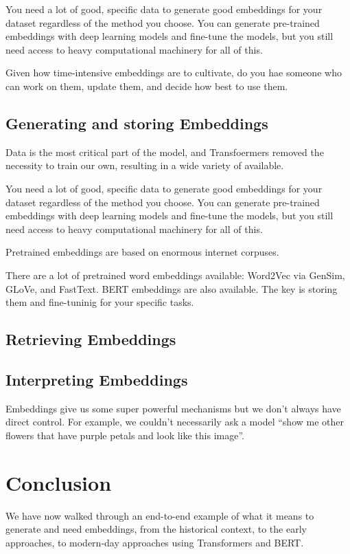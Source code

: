 \documentclass[11pt]{diazessay} %
\begin{document}
You need a lot of good, specific data to generate good embeddings for your dataset regardless of the method you choose. You can generate pre-trained embeddings with deep learning models and fine-tune the models, but you still need access to heavy computational machinery for all of this. 

Given how time-intensive embeddings are to cultivate, do you hae someone who can work on them, update them, and decide how best to use them. 

\subsection{Generating and storing Embeddings}
Data is the most critical part of the model, and Transfoermers removed the necessity to train our own, resulting in a wide variety of available. 

You need a lot of good, specific data to generate good embeddings for your dataset regardless of the method you choose. You can generate pre-trained embeddings with deep learning models and fine-tune the models, but you still need access to heavy computational machinery for all of this. 

Pretrained embeddings are based on enormous internet corpuses. 

There are a lot of pretrained word embeddings available: Word2Vec via GenSim, GLoVe, and FastText. BERT embeddings are also available. The key is storing them and fine-tuninig for your specific tasks. 

\subsection{Retrieving Embeddings}

\subsection{Interpreting Embeddings}
Embeddings give us some super powerful mechanisms but we don’t always have direct control. For example, we couldn’t necessarily ask a model “show me other flowers that have purple petals and look like this image”.


\section{Conclusion}

We have now walked through an end-to-end example of what it means to generate and need embeddings, from the historical context, to the early approaches, to modern-day approaches using Transformers and BERT. 
\end{document}
